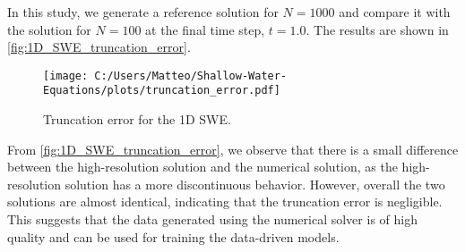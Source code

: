 In this study, we generate a reference solution for $N = 1000$ and compare it with the solution for $N = 100$ at the final time step, $t = 1.0$.
The results are shown in \autoref{fig:1D_SWE_truncation_error}.
\begin{figure}[H]
    \centering
    \texttt{[image: C:/Users/Matteo/Shallow-Water-Equations/plots/truncation\_error.pdf]}
    \caption{Truncation error for the 1D SWE.}\label{fig:1D_SWE_truncation_error}
\end{figure}
From \autoref{fig:1D_SWE_truncation_error}, we observe that there is a small difference between the high-resolution solution and the numerical solution, as the high-resolution solution has a more discontinuous behavior.
However, overall the two solutions are almost identical, indicating that the truncation error is negligible.
This suggests that the data generated using the numerical solver is of high quality and can be used for training the data-driven models.


